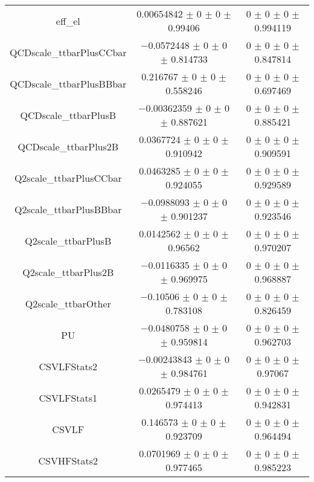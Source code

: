 \begin{table}
\begin{tabular}{ccc}
eff\_el & \num{0.00654842} $\pm$ \num{0} $\pm$ \num{0} $\pm$ \num{0.99406} & \num{0} $\pm$ \num{0} $\pm$ \num{0} $\pm$ \num{0.994119}\\
QCDscale\_ttbarPlusCCbar & \num{-0.0572448} $\pm$ \num{0} $\pm$ \num{0} $\pm$ \num{0.814733} & \num{0} $\pm$ \num{0} $\pm$ \num{0} $\pm$ \num{0.847814}\\
QCDscale\_ttbarPlusBBbar & \num{0.216767} $\pm$ \num{0} $\pm$ \num{0} $\pm$ \num{0.558246} & \num{0} $\pm$ \num{0} $\pm$ \num{0} $\pm$ \num{0.697469}\\
QCDscale\_ttbarPlusB & \num{-0.00362359} $\pm$ \num{0} $\pm$ \num{0} $\pm$ \num{0.887621} & \num{0} $\pm$ \num{0} $\pm$ \num{0} $\pm$ \num{0.885421}\\
QCDscale\_ttbarPlus2B & \num{0.0367724} $\pm$ \num{0} $\pm$ \num{0} $\pm$ \num{0.910942} & \num{0} $\pm$ \num{0} $\pm$ \num{0} $\pm$ \num{0.909591}\\
Q2scale\_ttbarPlusCCbar & \num{0.0463285} $\pm$ \num{0} $\pm$ \num{0} $\pm$ \num{0.924055} & \num{0} $\pm$ \num{0} $\pm$ \num{0} $\pm$ \num{0.929589}\\
Q2scale\_ttbarPlusBBbar & \num{-0.0988093} $\pm$ \num{0} $\pm$ \num{0} $\pm$ \num{0.901237} & \num{0} $\pm$ \num{0} $\pm$ \num{0} $\pm$ \num{0.923546}\\
Q2scale\_ttbarPlusB & \num{0.0142562} $\pm$ \num{0} $\pm$ \num{0} $\pm$ \num{0.96562} & \num{0} $\pm$ \num{0} $\pm$ \num{0} $\pm$ \num{0.970207}\\
Q2scale\_ttbarPlus2B & \num{-0.0116335} $\pm$ \num{0} $\pm$ \num{0} $\pm$ \num{0.969975} & \num{0} $\pm$ \num{0} $\pm$ \num{0} $\pm$ \num{0.968887}\\
Q2scale\_ttbarOther & \num{-0.10506} $\pm$ \num{0} $\pm$ \num{0} $\pm$ \num{0.783108} & \num{0} $\pm$ \num{0} $\pm$ \num{0} $\pm$ \num{0.826459}\\
PU & \num{-0.0480758} $\pm$ \num{0} $\pm$ \num{0} $\pm$ \num{0.959814} & \num{0} $\pm$ \num{0} $\pm$ \num{0} $\pm$ \num{0.962703}\\
CSVLFStats2 & \num{-0.00243843} $\pm$ \num{0} $\pm$ \num{0} $\pm$ \num{0.984761} & \num{0} $\pm$ \num{0} $\pm$ \num{0} $\pm$ \num{0.97067}\\
CSVLFStats1 & \num{0.0265479} $\pm$ \num{0} $\pm$ \num{0} $\pm$ \num{0.974413} & \num{0} $\pm$ \num{0} $\pm$ \num{0} $\pm$ \num{0.942831}\\
CSVLF & \num{0.146573} $\pm$ \num{0} $\pm$ \num{0} $\pm$ \num{0.923709} & \num{0} $\pm$ \num{0} $\pm$ \num{0} $\pm$ \num{0.964494}\\
CSVHFStats2 & \num{0.0701969} $\pm$ \num{0} $\pm$ \num{0} $\pm$ \num{0.977465} & \num{0} $\pm$ \num{0} $\pm$ \num{0} $\pm$ \num{0.985223}\\

\end{tabular}
\end{table}
